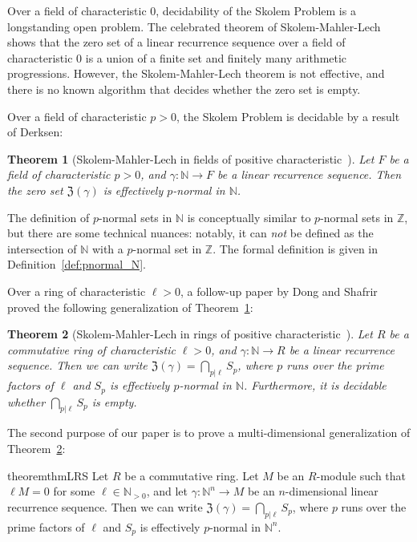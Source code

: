 \documentclass[letterpaper, 11pt, thm-restate]{article}
\numberwithin{equation}{section}
\newcommand{\Z}{\mathbb{Z}}
\newcommand{\N}{\mathbb{N}}
\newcommand{\mZ}{\mathfrak{Z}}
\newtheorem{theorem}{Theorem}[section]
\theoremstyle{definition}
\theoremstyle{definition}
\theoremstyle{definition}
\begin{document}
Over a field of characteristic $0$, decidability of the Skolem Problem  is a longstanding open problem.
The celebrated theorem of Skolem-Mahler-Lech~\cite{skolem1934verfahren, Mahler1935, lech1953note} shows that the zero set of a linear recurrence sequence over a field of characteristic $0$ is a union of a finite set and finitely many arithmetic progressions.
However, the Skolem-Mahler-Lech theorem is not effective, and there is no known algorithm that decides whether the zero set is empty.

Over a field of characteristic $p > 0$, the Skolem Problem is decidable by a result of Derksen:

\begin{theorem}[Skolem-Mahler-Lech in fields of positive characteristic~\cite{derksen2007skolem}]\label{thm:LRS_field}
 Let $F$ be a field of characteristic $p > 0$, and $\gamma \colon \N \rightarrow F$ be a linear recurrence sequence. Then the zero set $\mZ(\gamma)$ is effectively $p$-normal in $\N$.
\end{theorem}
The definition of $p$-normal sets in $\N$ is conceptually similar to $p$-normal sets in $\Z$, but there are some technical nuances: notably, it can \emph{not} be defined as the intersection of $\N$ with a $p$-normal set in $\Z$. The formal definition is given in Definition~\ref{def:pnormal_N}.

Over a ring of characteristic $\ell > 0$, a follow-up paper by Dong and Shafrir~\cite{dong2025skolemproblemringspositive} proved the following generalization of Theorem~\ref{thm:LRS_field}:

\begin{theorem}[Skolem-Mahler-Lech in rings of positive characteristic~\cite{dong2025skolemproblemringspositive}]\label{thm:LRS_ring}
 Let $R$ be a commutative ring of characteristic $\ell > 0$, and $\gamma \colon \N \rightarrow R$ be a linear recurrence sequence. Then we can write $\mZ(\gamma) = \bigcap_{p|\ell}S_p$, where $p$ runs over the prime factors of $\ell$ and $S_p$ is effectively $p$-normal in $\N$.
 Furthermore, it is decidable whether $\bigcap_{p|\ell}S_p$ is empty.
\end{theorem}

The second purpose of our paper is to prove a multi-dimensional generalization of Theorem~\ref{thm:LRS_ring}:

\begin{restatable}{theorem}{thmLRS}\label{thm:LRS}
    Let $R$ be a commutative ring.
    Let $M$ be an $R$-module such that $\ell M=0$ for some $\ell \in\N_{>0}$, and let $\gamma \colon \N^n \rightarrow M$ be an $n$-dimensional linear recurrence sequence.
    Then we can write $\mZ(\gamma) = \bigcap_{p|\ell}S_p$, where $p$ runs over the prime factors of $\ell$ and $S_p$ is effectively $p$-normal in $\N^n$.
\end{restatable}
\end{document}

